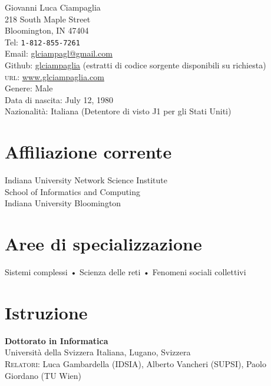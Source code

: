\documentclass[10pt, letterpaper, italian]{article}
\newcommand{\years}[1]{\marginnote{\small #1}}
\begin{document}
{\LARGE Giovanni Luca Ciampaglia}\\[1cm]
218 South Maple Street\\
Bloomington, IN 47404\\[.2cm]
Tel: \texttt{1-812-855-7261}\\
Email: \href{mailto:gciampag@indiana.edu}{glciampagl@gmail.com}\\
Github: \href{http://github.com/glciampaglia}{glciampaglia} (estratti di codice sorgente disponibili su richiesta)\\
\textsc{url}: \href{http://www.glciampaglia.com/}{www.glciampaglia.com}\\[.2cm]
Genere: Male\\
Data di nascita:  July 12, 1980\\
Nazionalità: Italiana (Detentore di visto J1 per gli Stati Uniti)

\section*{Affiliazione corrente}

Indiana University Network Science Institute\\
School of Informatics and Computing\\
Indiana University Bloomington

\section*{Aree di specializzazione}
Sistemi complessi • Scienza delle reti • Fenomeni sociali collettivi


\section*{Istruzione}
\noindent

\years{2012}\textbf{Dottorato in Informatica}\\
%
Università della Svizzera Italiana, Lugano, Svizzera\\
%
\textsc{Relatori}: Luca Gambardella (IDSIA), Alberto Vancheri (SUPSI), Paolo
Giordano (TU Wien)\\[1em]
\end{document}
